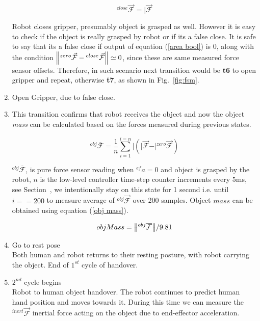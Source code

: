 \documentclass[a4paper, 12pt, oneside]{Thesis}  %
\begin{document}
\begin{enumerate}[start=0,label={\bf{t}\arabic*:}]
        \begin{equation}\label{Fclose}
        {}^{close}\vec{\mathcal{F}} = \vert{\vec{\mathcal{F}}}
        \end{equation}
    
    Robot closes gripper, presumably object is grasped as well. However it is easy to check if the object is really grasped by robot or if its a false close. It is safe to say that its a false close if output of equation (\ref{area bool}) is $0$, along with the condition $\norm{{}^{zero}\vec{\mathcal{F}}-{}^{close}\vec{\mathcal{F}}} \simeq{0}$, since these are same measured force sensor offsets. Therefore, in such scenario next transition would be \textbf{t6} to open gripper and repeat, otherwise \textbf{t7}, as shown in Fig.~\ref{fig:fsm}.
    
    \item Open Gripper, due to false close.
    
    \item This transition confirms that robot receives the object and now the object \textit{mass} can be calculated based on the forces measured during previous states.
    
    \begin{equation}
        {}^{obj}\overline{\mathcal{F}} = \frac{1}{n}\sum_{i=1}^{i=n} \vert{ (\vert{\vec{\mathcal{F}}} - \vert{{}^{zero}\vec{\mathcal{F}}}) }
    \end{equation}
    
    ${}^{obj}\overline{\mathcal{F}}$, is pure force sensor reading when ${}^{ef}a=0$ and object is grasped by the robot, $n$ is the low-level controller time-step counter increments every $5$ms, see Section~, we intentionally stay on this state for 1 second i.e. until $i==200$ to measure average of ${}^{obj}\vec{\mathcal{F}}$ over 200 samples. Object $mass$ can be obtained using equation (\ref{obj mass}).
    
    \begin{equation}\label{obj mass}
        objMass = \norm{{}^{obj}\overline{\mathcal{F}}}/9.81
    \end{equation}

    \item Go to rest pose \\
    Both human and robot returns to their resting posture, with robot carrying the object. End of $1^{st}$ cycle of handover.
    
    \item $2^{nd}$ cycle begins\\
    Robot to human object handover. The robot continues to predict human hand position and moves towards it. During this time we can measure the ${}^{inert}\vec{\mathcal{F}}$ inertial force acting on the object due to end-effector acceleration.


\end{enumerate}
\end{document}
